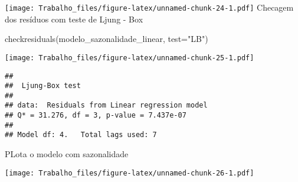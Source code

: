 \documentclass[
]{article}
\newenvironment{Shaded}{\begin{snugshade}}{\end{snugshade}}
\newcommand{\AttributeTok}[1]{\textcolor[rgb]{0.77,0.63,0.00}{#1}}
\newcommand{\DecValTok}[1]{\textcolor[rgb]{0.00,0.00,0.81}{#1}}
\newcommand{\FunctionTok}[1]{\textcolor[rgb]{0.00,0.00,0.00}{#1}}
\newcommand{\NormalTok}[1]{#1}
\newcommand{\SpecialCharTok}[1]{\textcolor[rgb]{0.00,0.00,0.00}{#1}}
\newcommand{\StringTok}[1]{\textcolor[rgb]{0.31,0.60,0.02}{#1}}
\begin{document}
\texttt{[image: Trabalho\_files/figure-latex/unnamed-chunk-24-1.pdf]}
Checagem dos resíduos com teste de Ljung - Box

\begin{Shaded}
\begin{Highlighting}[]
\FunctionTok{checkresiduals}\NormalTok{(modelo\_sazonalidade\_linear, }\AttributeTok{test=}\StringTok{"LB"}\NormalTok{)}
\end{Highlighting}
\end{Shaded}

\texttt{[image: Trabalho\_files/figure-latex/unnamed-chunk-25-1.pdf]}

\begin{verbatim}
## 
##  Ljung-Box test
## 
## data:  Residuals from Linear regression model
## Q* = 31.276, df = 3, p-value = 7.437e-07
## 
## Model df: 4.   Total lags used: 7
\end{verbatim}

PLota o modelo com sazonalidade

\begin{Shaded}
\end{Shaded}

\texttt{[image: Trabalho\_files/figure-latex/unnamed-chunk-26-1.pdf]}
\end{document}
